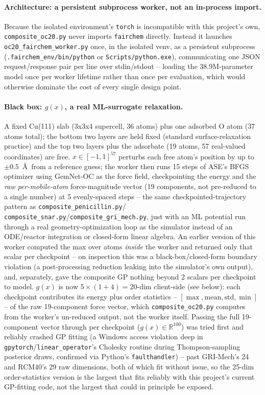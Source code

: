 \documentclass[11pt]{article}
\begin{document}
\paragraph{Architecture: a persistent subprocess worker, not an
in-process import.} Because the isolated environment's \texttt{torch}
is incompatible with this project's own, \texttt{composite\_oc20.py}
never imports \texttt{fairchem} directly. Instead it launches
\texttt{oc20\_fairchem\_worker.py} once, in the isolated venv, as a
persistent subprocess (\texttt{.fairchem\_env/\allowbreak bin\allowbreak/python} or
\texttt{Scripts\allowbreak/python.exe}), communicating one JSON request/response
pair per line over stdin/stdout -- loading the 38.9M-parameter model
once per worker lifetime rather than once per evaluation, which would
otherwise dominate the cost of every single design point.

\paragraph{Black box: $g(x)$, a real ML-surrogate relaxation.} A fixed
Cu(111) slab (3x3x4 supercell, 36 atoms) plus one adsorbed O atom (37
atoms total); the bottom two layers are held fixed (standard
surface-relaxation practice) and the top two layers plus the adsorbate
(19 atoms, 57 real-valued coordinates) are free. $x \in [-1,1]^{57}$
perturbs each free atom's position by up to $\pm0.5$~\AA\ from a
reference guess; the worker then runs 15 steps of ASE's BFGS optimizer
using GemNet-OC as the force field, checkpointing the energy and the
\emph{raw per-mobile-atom} force-magnitude vector (19 components, not
pre-reduced to a single number) at 5 evenly-spaced steps -- the same
checkpointed-trajectory pattern as \texttt{composite\_penicillin.py}/
\texttt{composite\_snar.py}/\texttt{composite\_gri\_mech.py}, just with
an ML potential run through a real geometry-optimization loop as the
simulator instead of an ODE/reactor integration or closed-form linear
algebra. An earlier version of this worker computed the max over atoms
\emph{inside} the worker and returned only that scalar per checkpoint
-- on inspection this was a black-box/closed-form boundary violation
(a post-processing reduction leaking into the simulator's own output),
and, separately, gave the composite GP nothing beyond 2 scalars per
checkpoint to model. $g(x)$ is now $5 \times (1 + 4) = 20$-dim client-side
(see below): each checkpoint contributes its energy plus order
statistics -- $[\max, \text{mean}, \text{std}, \min]$ -- of the raw
19-component force vector, which \texttt{composite\_oc20.py} computes
from the worker's un-reduced output, not the worker itself. Passing the
full 19-component vector through per checkpoint ($g(x) \in
\mathbb{R}^{100}$) was tried first and reliably crashed GP fitting (a
Windows access violation deep in \texttt{gpytorch}/\texttt{linear\_operator}'s
Cholesky routine during Thompson-sampling posterior draws, confirmed via
Python's \texttt{faulthandler}) -- past GRI-Mech's 24 and RCM40's 29 raw
dimensions, both of which fit without issue, so the 25-dim
order-statistics version is the largest that fits reliably with this
project's current GP-fitting code, not the largest that could in
principle be exposed.
\end{document}
